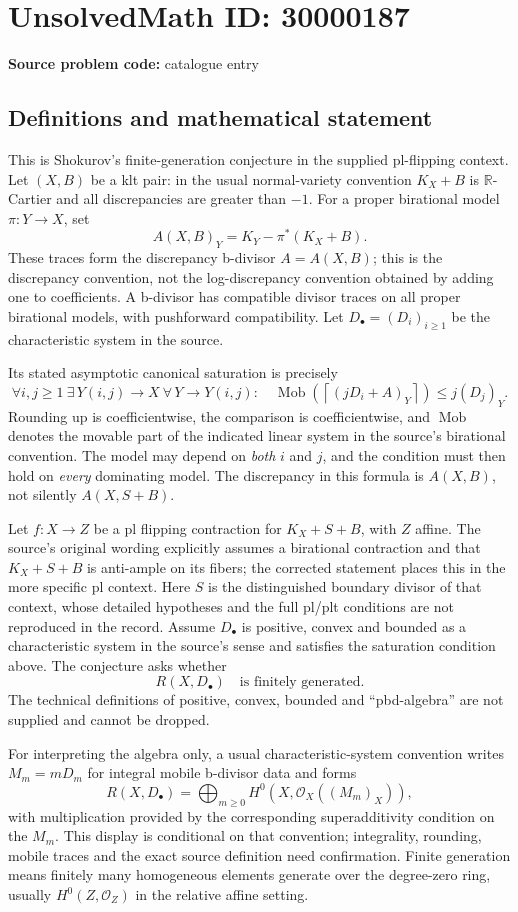 \documentclass[11pt]{article}
\newcommand{\R}{\mathbb{R}}
\begin{document}
\section*{UnsolvedMath ID: 30000187}
\textbf{Source problem code:} catalogue entry
\subsection{Definitions and mathematical statement}
This is Shokurov's finite-generation conjecture in the supplied pl-flipping context. Let $(X,B)$ be a klt pair: in the usual normal-variety convention $K_X+B$ is $\R$-Cartier and all discrepancies are greater than $-1$. For a proper birational model $\pi:Y\to X$, set
\[
 A(X,B)_Y=K_Y-\pi^*(K_X+B).
\]
These traces form the discrepancy b-divisor $A=A(X,B)$; this is the discrepancy convention, not the log-discrepancy convention obtained by adding one to coefficients. A b-divisor has compatible divisor traces on all proper birational models, with pushforward compatibility. Let $D_\bullet=(D_i)_{i\geq1}$ be the characteristic system in the source.

Its stated asymptotic canonical saturation is precisely
\[
 \forall i,j\geq1\ \exists\,Y(i,j)\to X\ \forall\,Y\to Y(i,j):\quad
 \operatorname{Mob}\!\left(\left\lceil(jD_i+A)_Y\right\rceil\right)
 \leq j(D_j)_Y.
\]
Rounding up is coefficientwise, the comparison is coefficientwise, and $\operatorname{Mob}$ denotes the movable part of the indicated linear system in the source's birational convention. The model may depend on \emph{both} $i$ and $j$, and the condition must then hold on \emph{every} dominating model. The discrepancy in this formula is $A(X,B)$, not silently $A(X,S+B)$.

Let $f:X\to Z$ be a pl flipping contraction for $K_X+S+B$, with $Z$ affine. The source's original wording explicitly assumes a birational contraction and that $K_X+S+B$ is anti-ample on its fibers; the corrected statement places this in the more specific pl context. Here $S$ is the distinguished boundary divisor of that context, whose detailed hypotheses and the full pl/plt conditions are not reproduced in the record. Assume $D_\bullet$ is positive, convex and bounded as a characteristic system in the source's sense and satisfies the saturation condition above. The conjecture asks whether
\[
 R(X,D_\bullet)\quad\text{is finitely generated}.
\]
The technical definitions of positive, convex, bounded and ``pbd-algebra'' are not supplied and cannot be dropped.

For interpreting the algebra only, a usual characteristic-system convention writes $M_m=mD_m$ for integral mobile b-divisor data and forms
\[
 R(X,D_\bullet)=\bigoplus_{m\geq0}
 H^0(X,\mathcal O_X((M_m)_X)),
\]
with multiplication provided by the corresponding superadditivity condition on the $M_m$. This display is conditional on that convention; integrality, rounding, mobile traces and the exact source definition need confirmation. Finite generation means finitely many homogeneous elements generate over the degree-zero ring, usually $H^0(Z,\mathcal O_Z)$ in the relative affine setting.
\end{document}
